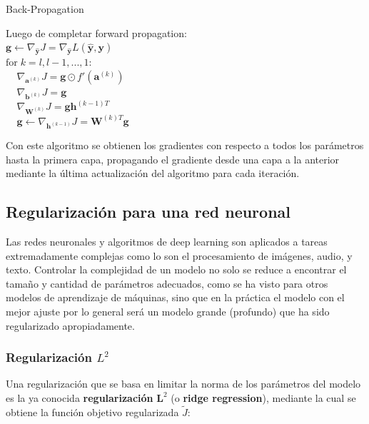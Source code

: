 \begin{algorithm}[H] %
\caption{Back-Propagation}\label{ML:Algorithm2}
Luego de completar forward propagation: \\
$\bm{g} \leftarrow \nabla_{\bm{\hat{y}}} J = \nabla_{\bm{\hat{y}}} L(\bm{\hat{y}},\bm{y})$\\
$\textrm{for} \;k = l,l-1,...,1:$\\
$\;\;\;\;\nabla_{\bm{a}^{(k)}} J = \bm{g}\odot f'(\bm{a}^{(k)})$\\
$\;\;\;\;\nabla_{\bm{b}^{(k)}} J = \bm{g}$\\
$\;\;\;\;\nabla_{\bm{W}^{(k)}} J = \bm{g}\bm{h}^{(k-1)T}$\\
$\;\;\;\;\bm{g} \leftarrow \nabla_{\bm{h}^{(k-1)}} J = \bm{W}^{(k)T}\bm{g}$
\end{algorithm}

Con este algoritmo se obtienen los gradientes con respecto a todos los par\'ametros hasta la primera capa, propagando el gradiente desde una capa a la anterior mediante la \'ultima actualizaci\'on del algoritmo para cada iteraci\'on.

\subsection{Regularización para una red neuronal}

Las redes neuronales y algoritmos de deep learning son aplicados a tareas extremadamente complejas como lo son el procesamiento de im\'agenes, audio, y texto. Controlar la complejidad de un modelo no solo se reduce a encontrar el tamaño y cantidad de parámetros adecuados, como se ha visto para otros modelos de aprendizaje de m\'aquinas, sino que en la pr\'actica el modelo con el mejor ajuste por lo general ser\'a un modelo grande (profundo) que ha sido regularizado apropiadamente.%

\subsubsection{Regularización ${L}^{2}$}

Una regularizaci\'on que se basa en limitar la norma de los parámetros del modelo es la ya conocida \textbf{regularizaci\'on} $\bm{L}^{2}$ (o \textbf{ridge regression}), mediante la cual se obtiene la funci\'on objetivo regularizada $\tilde{J}$:

